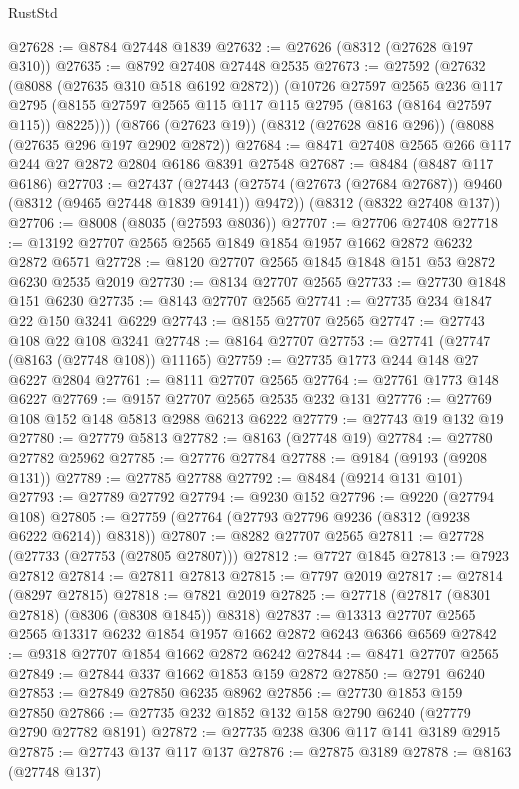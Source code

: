 \begin{lexlean}{RustStd}
\begin{coremodule}
@27628 := @8784 @27448 @1839
@27632 := @27626 (@8312 (@27628 @197 @310))
@27635 := @8792 @27408 @27448 @2535
@27673 := @27592
    (@27632
      (@8088 (@27635 @310 @518 @6192 @2872))
      (@10726
        @27597
        @2565
        @236
        @117
        @2795
        (@8155 @27597 @2565 @115 @117 @115 @2795 (@8163 (@8164 @27597 @115)) @8225)))
    (@8766 (@27623 @19))
    (@8312 (@27628 @816 @296))
    (@8088 (@27635 @296 @197 @2902 @2872))
@27684 := @8471 @27408 @2565 @266 @117 @244 @27 @2872 @2804 @6186 @8391 @27548
@27687 := @8484 (@8487 @117 @6186)
@27703 := @27437
    (@27443 (@27574 (@27673 (@27684 @27687)) @9460 (@8312 (@9465 @27448 @1839 @9141)) @9472))
    (@8312 (@8322 @27408 @137))
@27706 := @8008 (@8035 (@27593 @8036))
@27707 := @27706 @27408
@27718 := @13192 @27707 @2565 @2565 @1849 @1854 @1957 @1662 @2872 @6232 @2872 @6571
@27728 := @8120 @27707 @2565 @1845 @1848 @151 @53 @2872 @6230 @2535 @2019
@27730 := @8134 @27707 @2565
@27733 := @27730 @1848 @151 @6230
@27735 := @8143 @27707 @2565
@27741 := @27735 @234 @1847 @22 @150 @3241 @6229
@27743 := @8155 @27707 @2565
@27747 := @27743 @108 @22 @108 @3241
@27748 := @8164 @27707
@27753 := @27741 (@27747 (@8163 (@27748 @108)) @11165)
@27759 := @27735 @1773 @244 @148 @27 @6227 @2804
@27761 := @8111 @27707 @2565
@27764 := @27761 @1773 @148 @6227
@27769 := @9157 @27707 @2565 @2535 @232 @131
@27776 := @27769 @108 @152 @148 @5813 @2988 @6213 @6222
@27779 := @27743 @19 @132 @19
@27780 := @27779 @5813
@27782 := @8163 (@27748 @19)
@27784 := @27780 @27782 @25962
@27785 := @27776 @27784
@27788 := @9184 (@9193 (@9208 @131))
@27789 := @27785 @27788
@27792 := @8484 (@9214 @131 @101)
@27793 := @27789 @27792
@27794 := @9230 @152
@27796 := @9220 (@27794 @108)
@27805 := @27759 (@27764 (@27793 @27796 @9236 (@8312 (@9238 @6222 @6214)) @8318))
@27807 := @8282 @27707 @2565
@27811 := @27728 (@27733 (@27753 (@27805 @27807)))
@27812 := @7727 @1845
@27813 := @7923 @27812
@27814 := @27811 @27813
@27815 := @7797 @2019
@27817 := @27814 (@8297 @27815)
@27818 := @7821 @2019
@27825 := @27718 (@27817 (@8301 @27818) (@8306 (@8308 @1845)) @8318)
@27837 := @13313 @27707 @2565 @2565 @13317 @6232 @1854 @1957 @1662 @2872 @6243 @6366 @6569
@27842 := @9318 @27707 @1854 @1662 @2872 @6242
@27844 := @8471 @27707 @2565
@27849 := @27844 @337 @1662 @1853 @159 @2872
@27850 := @2791 @6240
@27853 := @27849 @27850 @6235 @8962
@27856 := @27730 @1853 @159 @27850
@27866 := @27735 @232 @1852 @132 @158 @2790 @6240 (@27779 @2790 @27782 @8191)
@27872 := @27735 @238 @306 @117 @141 @3189 @2915
@27875 := @27743 @137 @117 @137
@27876 := @27875 @3189
@27878 := @8163 (@27748 @137)

\end{coremodule}
\end{lexlean}
